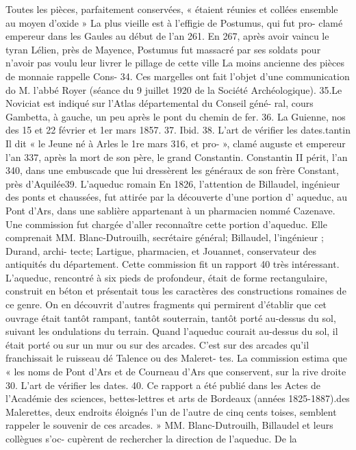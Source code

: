 \documentclass[a4paper,11pt]{book}
\begin{document}
Toutes les pièces, parfaitement conservées, « étaient
réunies et collées ensemble au moyen d'oxide »
La plus vieille est à l'effigie de Postumus, qui fut pro-
clamé empereur dans les Gaules au début de l'an 261. En
267, après avoir vaincu le tyran Lélien, près de Mayence,
Postumus fut massacré par ses soldats pour n'avoir pas
voulu leur livrer le pillage de cette ville
La moins ancienne des pièces de monnaie rappelle Cons-
34. Ces margelles ont fait l'objet d'une communication do M. l'abbé
Royer (séance du 9 juillet 1920 de la Société Archéologique).
35.Le Noviciat est indiqué sur l'Atlas départemental du Conseil géné-
ral, cours Gambetta, à gauche, un peu après le pont du chemin de fer.
36. La Guienne, nos des 15 et 22 février et 1er mars 1857.
37. Ibid.
38. L'art de vérifier les dates.tantin Il dit « le Jeune né à Arles le 1re mars 316, et pro-
»,
clamé auguste et empereur l'an 337, après la mort de son
père, le grand Constantin.
Constantin II périt, l'an 340, dans une embuscade que
lui dressèrent les généraux de
son frère Constant, près
d'Aquilée39.
L'aqueduc romain
En 1826, l'attention de Billaudel, ingénieur des ponts et
chaussées, fut attirée par la découverte d'une portion
d' aqueduc,
au Pont d'Ars, dans une sablière appartenant
à un pharmacien nommé Cazenave.
Une commission fut chargée d'aller reconnaître cette
portion d'aqueduc. Elle comprenait MM. Blanc-Dutrouilh,
secrétaire général; Billaudel, l'ingénieur ; Durand, archi-
tecte; Lartigue, pharmacien, et Jouannet, conservateur des
antiquités du département.
Cette commission fit un rapport 40 très intéressant.
L'aqueduc, rencontré à six pieds de profondeur, était
de forme rectangulaire, construit en béton et présentait
tous les caractères des constructions romaines de ce genre.
On en découvrit d'autres fragments qui permirent d'établir
que cet ouvrage était tantôt rampant, tantôt souterrain,
tantôt porté au-dessus du sol, suivant les ondulations du
terrain.
Quand l'aqueduc courait au-dessus du sol, il était porté
ou sur un mur ou sur des arcades. C'est sur des arcades
qu'il franchissait le ruisseau dé Talence ou des Maleret-
tes. La commission estima que « les noms de Pont d'Ars
et de Courneau d'Ars que conservent, sur la rive droite
30. L'art de vérifier les dates.
40. Ce rapport a été publié dans les Actes de l'Académie des sciences,
bettes-lettres et arts de Bordeaux (années 1825-1887).des Malerettes, deux endroits éloignés l'un de l'autre de
cinq cents toises, semblent rappeler le souvenir de ces
arcades. »
MM. Blanc-Dutrouilh, Billaudel et leurs collègues s'oc-
cupèrent de rechercher la direction de l'aqueduc. De la
\end{document}
